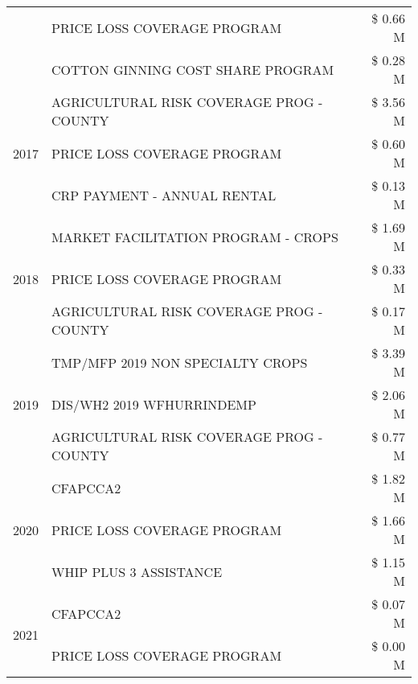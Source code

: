 \begin{tabular}{llr}
 & PRICE LOSS COVERAGE PROGRAM & \$ 0.66 M \\
 & COTTON GINNING COST SHARE PROGRAM & \$ 0.28 M \\
\cline{1-3}
\multirow[t]{3}{*}{2017} & AGRICULTURAL RISK COVERAGE PROG - COUNTY & \$ 3.56 M \\
 & PRICE LOSS COVERAGE PROGRAM & \$ 0.60 M \\
 & CRP PAYMENT - ANNUAL RENTAL & \$ 0.13 M \\
\cline{1-3}
\multirow[t]{3}{*}{2018} & MARKET FACILITATION PROGRAM - CROPS & \$ 1.69 M \\
 & PRICE LOSS COVERAGE PROGRAM & \$ 0.33 M \\
 & AGRICULTURAL RISK COVERAGE PROG - COUNTY & \$ 0.17 M \\
\cline{1-3}
\multirow[t]{3}{*}{2019} & TMP/MFP 2019 NON SPECIALTY CROPS & \$ 3.39 M \\
 & DIS/WH2 2019 WFHURRINDEMP & \$ 2.06 M \\
 & AGRICULTURAL RISK COVERAGE PROG - COUNTY & \$ 0.77 M \\
\cline{1-3}
\multirow[t]{3}{*}{2020} & CFAPCCA2 & \$ 1.82 M \\
 & PRICE LOSS COVERAGE PROGRAM & \$ 1.66 M \\
 & WHIP PLUS 3 ASSISTANCE & \$ 1.15 M \\
\cline{1-3}
\multirow[t]{2}{*}{2021} & CFAPCCA2 & \$ 0.07 M \\
 & PRICE LOSS COVERAGE PROGRAM & \$ 0.00 M \\
\cline{1-3}
\bottomrule
\end{tabular}
